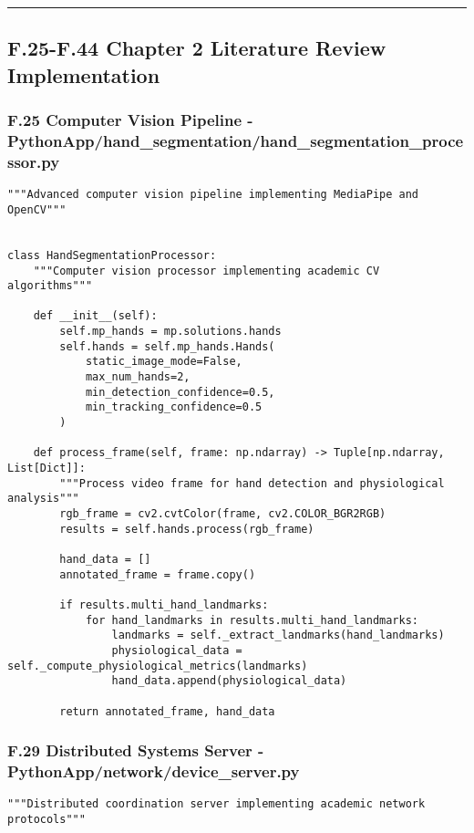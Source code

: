\documentclass[11pt,a4paper]{report}
\begin{document}
{{\hrule

\subsection{F.25-F.44 Chapter 2 Literature Review Implementation}

\subsubsection{F.25 Computer Vision Pipeline - PythonApp/hand_segmentation/hand_segmentation_processor.py}

\begin{verbatim}
"""Advanced computer vision pipeline implementing MediaPipe and OpenCV"""


class HandSegmentationProcessor:
    """Computer vision processor implementing academic CV algorithms"""

    def __init__(self):
        self.mp_hands = mp.solutions.hands
        self.hands = self.mp_hands.Hands(
            static_image_mode=False,
            max_num_hands=2,
            min_detection_confidence=0.5,
            min_tracking_confidence=0.5
        )

    def process_frame(self, frame: np.ndarray) -> Tuple[np.ndarray, List[Dict]]:
        """Process video frame for hand detection and physiological analysis"""
        rgb_frame = cv2.cvtColor(frame, cv2.COLOR_BGR2RGB)
        results = self.hands.process(rgb_frame)

        hand_data = []
        annotated_frame = frame.copy()

        if results.multi_hand_landmarks:
            for hand_landmarks in results.multi_hand_landmarks:
                landmarks = self._extract_landmarks(hand_landmarks)
                physiological_data = self._compute_physiological_metrics(landmarks)
                hand_data.append(physiological_data)

        return annotated_frame, hand_data
\end{verbatim}

\subsubsection{F.29 Distributed Systems Server - PythonApp/network/device_server.py}

\begin{verbatim}
"""Distributed coordination server implementing academic network protocols"""



\end{verbatim}}}
\end{document}
